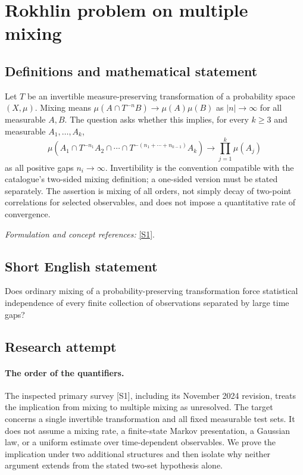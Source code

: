 \documentclass[11pt]{article}
\begin{document}
\section*{\texorpdfstring{Rokhlin problem on multiple mixing}{Rokhlin problem on multiple mixing}}\label{30006903}
\subsection{Definitions and mathematical statement}
Let $T$ be an invertible measure-preserving transformation of a probability space $(X,\mu)$. Mixing means $\mu(A\cap T^{-n}B)\to\mu(A)\mu(B)$ as $|n|\to\infty$ for all measurable $A,B$. The question asks whether this implies, for every $k\ge3$ and measurable $A_1,\ldots,A_k$,
\[
 \mu\!\left(A_1\cap T^{-n_1}A_2\cap\cdots\cap
 T^{-(n_1+\cdots+n_{k-1})}A_k\right)
 \longrightarrow\prod_{j=1}^k\mu(A_j)
\]
as all positive gaps $n_i\to\infty$. Invertibility is the convention compatible with the catalogue's two-sided mixing definition; a one-sided version must be stated separately. The assertion is mixing of all orders, not simply decay of two-point correlations for selected observables, and does not impose a quantitative rate of convergence.
\par\smallskip\textit{Formulation and concept references:} \href{https://arxiv.org/abs/2411.07234}{[S1]}.

\subsection{Short English statement}
Does ordinary mixing of a probability-preserving transformation force statistical independence of every finite collection of observations separated by large time gaps?
\subsection{Research attempt}
\paragraph{The order of the quantifiers.}
The inspected primary survey [S1], including its November 2024
revision, treats the implication from mixing to multiple mixing as
unresolved. The target concerns a single invertible transformation
and all fixed measurable test sets. It does not assume a mixing rate,
a finite-state Markov presentation, a Gaussian law, or a uniform
estimate over time-dependent observables. We prove the implication
under two additional structures and then isolate why neither argument
extends from the stated two-set hypothesis alone.
\end{document}
